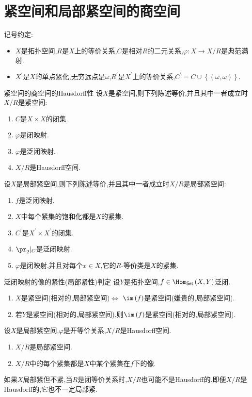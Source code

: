 \section{紧空间和局部紧空间的商空间}

记号约定:

\begin{itemize}
	\item $X$是拓扑空间,$R$是$X$上的等价关系,$C$是相对$R$的二元关系,$\varphi:X\to X/R$是典范满射.
	\item $X^{\prime}$是$X$的单点紧化,无穷远点是$\omega$,$R^{\prime}$是$X^{\prime}$上的等价关系,$C^{\prime}=C\cup\left\{\left(\omega,\omega\right)\right\}$.
\end{itemize}

\begin{proposition}{紧空间的商空间的Hausdorff性}{}
	设$X$是紧空间,则下列陈述等价,并且其中一者成立时$X/R$是紧空间:
	\begin{enumerate}
		\item $C$是$X\times X$的闭集.
		\item $\varphi$是闭映射.
		\item $\varphi$是泛闭映射.
		\item $X/R$是Hausdorff空间.
	\end{enumerate}
\end{proposition}

\begin{proposition}{}{}
	设$X$是局部紧空间,则下列陈述等价,并且其中一者成立时$X/R$是局部紧空间:
	\begin{enumerate}
		\item $f$是泛闭映射.
		\item $X$中每个紧集的饱和化都是$X$的紧集.
		\item $C^{\prime}$是$X^{\prime}\times X^{\prime}$的闭集.
		\item $\pr_{2}|_{C}$是泛闭映射.
		\item $\varphi$是闭映射,并且对每个$x\in X$,它的$R$-等价类是$X$的紧集.
	\end{enumerate}
\end{proposition}

\begin{corollary}{泛闭映射的像的紧性(局部紧性)判定}{}
	设$Y$是拓扑空间,$f\in\Hom_{\mathsf{Set}}\left(X,Y\right)$泛闭.
	\begin{enumerate}
		\item $X$是紧空间(相对的,局部紧空间)$\iff$ $\im\left(f\right)$是紧空间(嫌贵的,局部紧空间).
		\item 若$Y$是紧空间(相对的,局部紧空间),则$\im\left(f\right)$是紧空间(相对的,局部紧空间).
	\end{enumerate}
\end{corollary}

\begin{proposition}{}{}
	设$X$是局部紧空间,$\varphi$是开等价关系,$X/R$是Hausdorff空间.
	\begin{enumerate}
		\item $X/R$是局部紧空间.
		\item $X/R$中的每个紧集都是$X$中某个紧集在$f$下的像.
	\end{enumerate}
\end{proposition}

\begin{remark}{}{}
	如果$X$局部紧但不紧,当$R$是闭等价关系时,$X/R$也可能不是Hausdorff的.即便$X/R$是Hausdorff的,它也不一定局部紧.
\end{remark}



